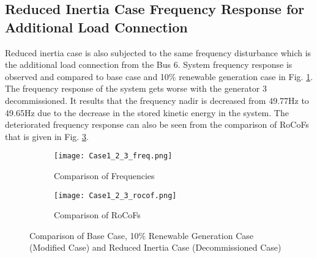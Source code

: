 \subsection{Reduced Inertia Case Frequency Response for Additional Load Connection}
Reduced inertia case is also subjected to the same frequency disturbance which is the additional load connection from the Bus 6. System frequency response is observed and compared to base case and 10\% renewable generation case in Fig. \ref{Case1_2_3_freq}. The frequency response of the system gets worse with the generator 3 decommissioned. It results that the frequency nadir is decreased from 49.77Hz to 49.65Hz due to the decrease in the stored kinetic energy in the system. The deteriorated frequency response can also be seen from the comparison of RoCoFs that is given in Fig. \ref{Case1_2_3_rocof}. 
\begin{figure}[h!]
	\centering
	\begin{subfigure}{0.8\textwidth} %
	\centering	\texttt{[image: Case1\_2\_3\_freq.png]}
		\caption{Comparison of Frequencies}		
		\label{Case1_2_3_freq}
	\end{subfigure}
	\vspace{0.1em} %
	\begin{subfigure}{0.8\textwidth}
	\centering	\texttt{[image: Case1\_2\_3\_rocof.png]}
		\caption{Comparison of RoCoFs}
		\label{Case1_2_3_rocof}	
	\end{subfigure}
	\caption{Comparison of Base Case, 10\% Renewable Generation Case (Modified Case) and Reduced Inertia Case (Decommissioned Case)}
\end{figure}
